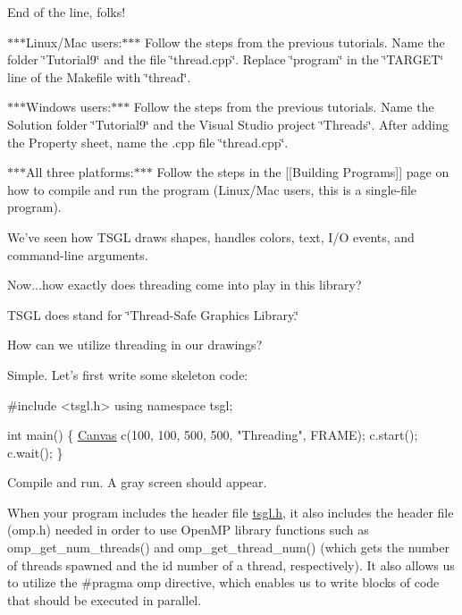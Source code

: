 End of the line, folks!

$\ast$$\ast$$\ast$\-Linux/\-Mac users\-:$\ast$$\ast$$\ast$ Follow the steps from the previous tutorials. Name the folder \char`\"{}\-Tutorial9\char`\"{} and the file \char`\"{}thread.\-cpp\char`\"{}. Replace \char`\"{}program\char`\"{} in the \char`\"{}\-T\-A\-R\-G\-E\-T\char`\"{} line of the Makefile with \char`\"{}thread\char`\"{}.

$\ast$$\ast$$\ast$\-Windows users\-:$\ast$$\ast$$\ast$ Follow the steps from the previous tutorials. Name the Solution folder \char`\"{}\-Tutorial9\char`\"{} and the Visual Studio project \char`\"{}\-Threads\char`\"{}. After adding the Property sheet, name the .cpp file \char`\"{}thread.\-cpp\char`\"{}.

$\ast$$\ast$$\ast$\-All three platforms\-:$\ast$$\ast$$\ast$ Follow the steps in the \mbox{[}\mbox{[}Building Programs\mbox{]}\mbox{]} page on how to compile and run the program (Linux/\-Mac users, this is a single-\/file program).

We've seen how T\-S\-G\-L draws shapes, handles colors, text, I/\-O events, and command-\/line arguments.

Now...how exactly does threading come into play in this library?

T\-S\-G\-L does stand for \char`\"{}\-Thread-\/\-Safe Graphics Library.\char`\"{}

How can we utilize threading in our drawings?

Simple. Let's first write some skeleton code\-:


\begin{DoxyCode}
\textcolor{preprocessor}{#include <tsgl.h>}
\textcolor{keyword}{using namespace }tsgl;

\textcolor{keywordtype}{int} main() \{
  \hyperlink{classtsgl_1_1_canvas}{Canvas} c(100, 100, 500, 500, \textcolor{stringliteral}{"Threading"}, FRAME);
  c.start();
  c.wait();
\}
\end{DoxyCode}


Compile and run. A gray screen should appear.

When your program includes the header file {\ttfamily \hyperlink{tsgl_8h_source}{tsgl.\-h}}, it also includes the header file ({\ttfamily omp.\-h}) needed in order to use Open\-M\-P library functions such as {\ttfamily omp\-\_\-get\-\_\-num\-\_\-threads()} and {\ttfamily omp\-\_\-get\-\_\-thread\-\_\-num()} (which gets the number of threads spawned and the id number of a thread, respectively). It also allows us to utilize the {\ttfamily \#pragma omp} directive, which enables us to write blocks of code that should be executed in parallel.

